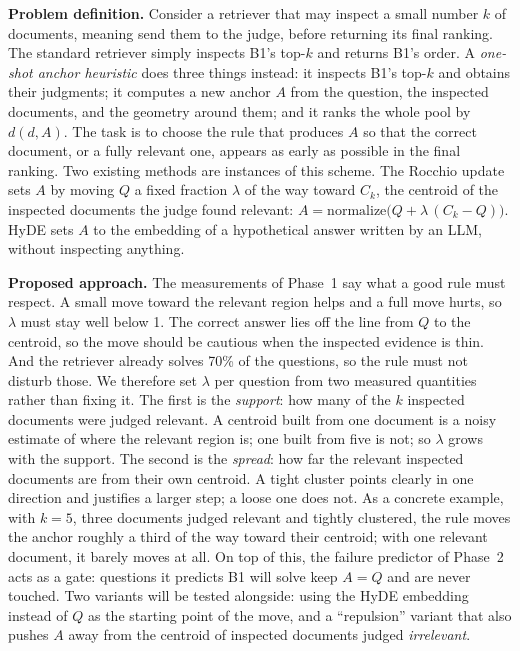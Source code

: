 \documentclass[12pt,a4paper]{article}
\newcommand{\dist}{d}
\begin{document}
\textbf{Problem definition.} Consider a retriever that may inspect a small number $k$ of documents, meaning send them to the judge, before returning its final ranking. The standard retriever simply inspects B1's top-$k$ and returns B1's order. A \emph{one-shot anchor heuristic} does three things instead: it inspects B1's top-$k$ and obtains their judgments; it computes a new anchor $A$ from the question, the inspected documents, and the geometry around them; and it ranks the whole pool by $\dist(d,A)$. The task is to choose the rule that produces $A$ so that the correct document, or a fully relevant one, appears as early as possible in the final ranking. Two existing methods are instances of this scheme. The Rocchio update sets $A$ by moving $Q$ a fixed fraction $\lambda$ of the way toward $C_k$, the centroid of the inspected documents the judge found relevant: $A=\mathrm{normalize}\bigl(Q+\lambda\,(C_k-Q)\bigr)$. HyDE sets $A$ to the embedding of a hypothetical answer written by an LLM, without inspecting anything.

\textbf{Proposed approach.} The measurements of Phase~1 say what a good rule must respect. A small move toward the relevant region helps and a full move hurts, so $\lambda$ must stay well below 1. The correct answer lies off the line from $Q$ to the centroid, so the move should be cautious when the inspected evidence is thin. And the retriever already solves 70\% of the questions, so the rule must not disturb those. We therefore set $\lambda$ per question from two measured quantities rather than fixing it. The first is the \emph{support}: how many of the $k$ inspected documents were judged relevant. A centroid built from one document is a noisy estimate of where the relevant region is; one built from five is not; so $\lambda$ grows with the support. The second is the \emph{spread}: how far the relevant inspected documents are from their own centroid. A tight cluster points clearly in one direction and justifies a larger step; a loose one does not. As a concrete example, with $k=5$, three documents judged relevant and tightly clustered, the rule moves the anchor roughly a third of the way toward their centroid; with one relevant document, it barely moves at all. On top of this, the failure predictor of Phase~2 acts as a gate: questions it predicts B1 will solve keep $A=Q$ and are never touched. Two variants will be tested alongside: using the HyDE embedding instead of $Q$ as the starting point of the move, and a ``repulsion'' variant that also pushes $A$ away from the centroid of inspected documents judged \emph{irrelevant}.
\end{document}
